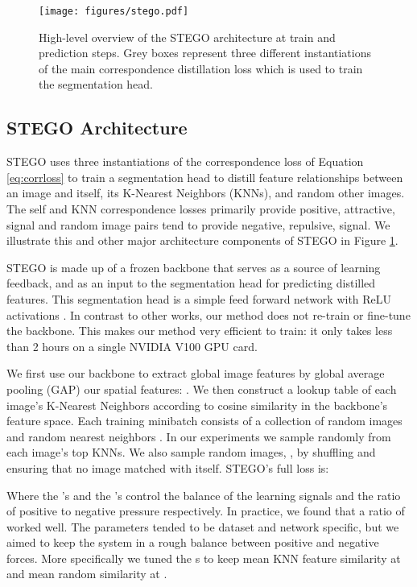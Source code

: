 \documentclass{article} \usepackage{iclr2022_conference,times}
\begin{document}
\begin{figure}[t]
 \centering
 \texttt{[image: figures/stego.pdf]}
  \vspace{-.2in}
  \caption{High-level overview of the STEGO architecture at train and prediction steps. Grey boxes represent three different instantiations of the main correspondence distillation loss which is used to train the segmentation head. }
\label{fig:arch}
\end{figure} 
\subsection{STEGO Architecture}
\label{sec:architecture}



STEGO uses three instantiations of the correspondence loss of Equation \ref{eq:corrloss} to train a segmentation head to distill feature relationships between an image and itself, its K-Nearest Neighbors (KNNs), and random other images. The self and KNN correspondence losses primarily provide positive, attractive, signal and random image pairs tend to provide negative, repulsive, signal. We illustrate this and other major architecture components of STEGO in Figure \ref{fig:arch}. 

STEGO is made up of a frozen backbone that serves as a source of learning feedback, and as an input to the segmentation head for predicting distilled features. This segmentation head is a simple feed forward network with ReLU activations \citep{relu}. In contrast to other works, our method does not re-train or fine-tune the backbone. This makes our method very efficient to train: it only takes less than 2 hours on a single NVIDIA V100 GPU card. 






We first use our backbone to extract global image features by global average pooling (GAP) our spatial features: . We then construct a lookup table of each image's K-Nearest Neighbors according to cosine similarity in the backbone's feature space. Each training minibatch consists of a collection of random images  and random nearest neighbors . In our experiments we sample  randomly from each image's top  KNNs. We also sample random images, , by shuffling  and ensuring that no image matched with itself. STEGO's full loss is:

Where the 's and the 's control the balance of the learning signals and the ratio of positive to negative pressure respectively. In practice, we found that a ratio of  worked well. The  parameters tended to be dataset and network specific, but we aimed to keep the system in a rough balance between positive and negative forces. More specifically we tuned the s to keep mean KNN feature similarity at  and mean random similarity at . 
\end{document}
